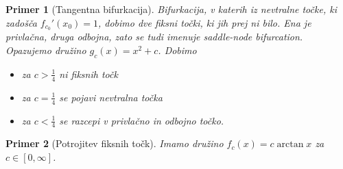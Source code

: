 \documentclass{article}
\newtheorem{primer}{Primer}
\begin{document}
\begin{primer}[Tangentna bifurkacija]
Bifurkacija, v katerih iz nevtralne točke, ki zadošča $f_{c_0}'(x_0) = 1$, 
dobimo dve fiksni točki, ki jih prej ni bilo. Ena je privlačna, druga odbojna, 
zato se tudi imenuje saddle-node bifurcation. 
Opazujemo družino $g_c(x) = x^2 + c$. Dobimo 
\begin{itemize}
    \item za $c > \frac{1}{4}$ ni fiksnih točk 
    \item za $c = \frac{1}{4}$ se pojavi nevtralna točka 
    \item za $c < \frac{1}{4}$ se razcepi v privlačno in odbojno točko.
\end{itemize}
\end{primer}

\begin{primer}[Potrojitev fiksnih točk]
Imamo družino $f_c(x) = c\arctan{x}$ za $c\in [0, \infty]$.
\end{primer}
\end{document}
